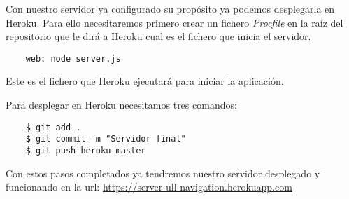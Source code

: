 Con nuestro servidor ya configurado su propósito ya podemos desplegarla en Heroku. Para ello necesitaremos primero crear un fichero \textit{Procfile} en la raíz del repositorio que le dirá a Heroku cual es el fichero que inicia el servidor.

\begin{lstlisting}
    web: node server.js
\end{lstlisting}

Este es el fichero que Heroku ejecutará para iniciar la aplicación.

Para desplegar en Heroku necesitamos tres comandos:

\begin{lstlisting}
    $ git add .
    $ git commit -m "Servidor final"
    $ git push heroku master
\end{lstlisting}

Con estos pasos completados ya tendremos nuestro servidor desplegado y funcionando en la url: \href{https://server-ull-navigation.herokuapp.com}{https://server-ull-navigation.herokuapp.com}
